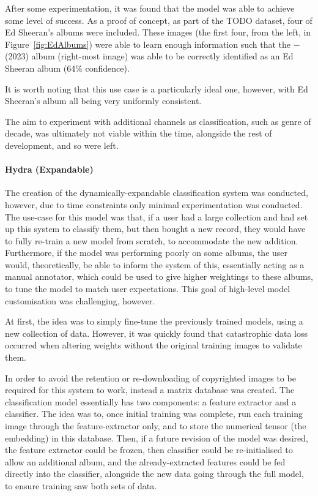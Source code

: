                 After some experimentation, it was found that the model was able to achieve some level of success. As a proof of concept, as part of the TODO dataset, four of Ed Sheeran's albums were included. These images (the first four, from the left, in Figure~\ref{fig:EdAlbums}) were able to learn enough information such that the − (2023) album (right-most image) was able to be correctly identified as an Ed Sheeran album (64\% confidence).
    
                It is worth noting that this use case is a particularly ideal one, however, with Ed Sheeran's album all being very uniformly consistent.
    
                The aim to experiment with additional channels as classification, such as genre of decade, was ultimately not viable within the time, alongside the rest of development, and so were left.
    
                \paragraph{Hydra (Expandable)}
    
                The creation of the dynamically-expandable classification system was conducted, however, due to time constraints only minimal experimentation was conducted. The use-case for this model was that, if a user had a large collection and had set up this system to classify them, but then bought a new record, they would have to fully re-train a new model from scratch, to accommodate the new addition. Furthermore, if the model was performing poorly on some albums, the user would, theoretically, be able to inform the system of this, essentially acting as a manual annotator, which could be used to give higher weightings to these albums, to tune the model to match user expectations. This goal of high-level model customisation was challenging, however.
    
                At first, the idea was to simply fine-tune the previously trained models, using a new collection of data. However, it was quickly found that catastrophic data loss occurred when altering weights without the original training images to validate them.
    
                In order to avoid the retention or re-downloading of copyrighted images to be required for this system to work, instead a matrix database was created. The classification model essentially has two components: a feature extractor and a classifier. The idea was to, once initial training was complete, run each training image through the feature-extractor only, and to store the numerical tensor (the embedding) in this database. Then, if a future revision of the model was desired, the feature extractor could be frozen, then classifier could be re-initialised to allow an additional album, and the already-extracted features could be fed directly into the classifier, alongside the new data going through the full model, to ensure training saw both sets of data.
    
